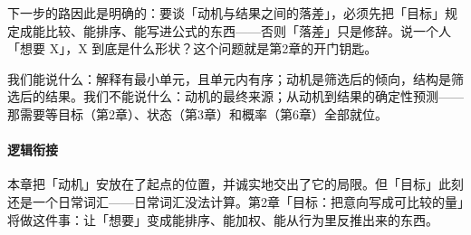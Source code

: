 \documentclass[../../main2.tex]{subfiles}
\begin{document}
	下一步的路因此是明确的：要谈「动机与结果之间的落差」，必须先把「目标」规定成能比较、能排序、能写进公式的东西——否则「落差」只是修辞。说一个人「想要 X」，X 到底是什么形状？这个问题就是第2章的开门钥匙。

	我们能说什么：解释有最小单元，且单元内有序；动机是筛选后的倾向，结构是筛选后的结果。我们不能说什么：动机的最终来源；从动机到结果的确定性预测——那需要等目标（第2章）、状态（第3章）和概率（第6章）全部就位。

	\paragraph*{逻辑衔接}
	本章把「动机」安放在了起点的位置，并诚实地交出了它的局限。但「目标」此刻还是一个日常词汇——日常词汇没法计算。第2章「目标：把意向写成可比较的量」将做这件事：让「想要」变成能排序、能加权、能从行为里反推出来的东西。
\end{document}
